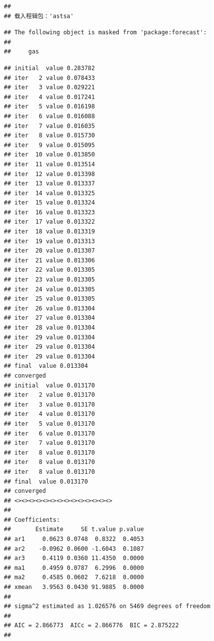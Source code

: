 \documentclass[
]{article}
\newenvironment{Shaded}{\begin{snugshade}}{\end{snugshade}}
\newcommand{\AttributeTok}[1]{\textcolor[rgb]{0.13,0.29,0.53}{#1}}
\newcommand{\DecValTok}[1]{\textcolor[rgb]{0.00,0.00,0.81}{#1}}
\newcommand{\FunctionTok}[1]{\textcolor[rgb]{0.13,0.29,0.53}{\textbf{#1}}}
\newcommand{\NormalTok}[1]{#1}
\newcommand{\OtherTok}[1]{\textcolor[rgb]{0.56,0.35,0.01}{#1}}
\newcommand{\SpecialCharTok}[1]{\textcolor[rgb]{0.81,0.36,0.00}{\textbf{#1}}}
\begin{document}
\begin{verbatim}
## 
## 载入程辑包：'astsa'
\end{verbatim}

\begin{verbatim}
## The following object is masked from 'package:forecast':
## 
##     gas
\end{verbatim}

\begin{Shaded}
\end{Shaded}

\begin{verbatim}
## initial  value 0.283782 
## iter   2 value 0.078433
## iter   3 value 0.029221
## iter   4 value 0.017241
## iter   5 value 0.016198
## iter   6 value 0.016088
## iter   7 value 0.016035
## iter   8 value 0.015730
## iter   9 value 0.015095
## iter  10 value 0.013850
## iter  11 value 0.013514
## iter  12 value 0.013398
## iter  13 value 0.013337
## iter  14 value 0.013325
## iter  15 value 0.013324
## iter  16 value 0.013323
## iter  17 value 0.013322
## iter  18 value 0.013319
## iter  19 value 0.013313
## iter  20 value 0.013307
## iter  21 value 0.013306
## iter  22 value 0.013305
## iter  23 value 0.013305
## iter  24 value 0.013305
## iter  25 value 0.013305
## iter  26 value 0.013304
## iter  27 value 0.013304
## iter  28 value 0.013304
## iter  29 value 0.013304
## iter  29 value 0.013304
## iter  29 value 0.013304
## final  value 0.013304 
## converged
## initial  value 0.013170 
## iter   2 value 0.013170
## iter   3 value 0.013170
## iter   4 value 0.013170
## iter   5 value 0.013170
## iter   6 value 0.013170
## iter   7 value 0.013170
## iter   8 value 0.013170
## iter   8 value 0.013170
## iter   8 value 0.013170
## final  value 0.013170 
## converged
## <><><><><><><><><><><><><><>
##  
## Coefficients: 
##       Estimate     SE t.value p.value
## ar1     0.0623 0.0748  0.8322  0.4053
## ar2    -0.0962 0.0600 -1.6043  0.1087
## ar3     0.4119 0.0360 11.4350  0.0000
## ma1     0.4959 0.0787  6.2996  0.0000
## ma2     0.4585 0.0602  7.6218  0.0000
## xmean   3.9563 0.0430 91.9885  0.0000
## 
## sigma^2 estimated as 1.026576 on 5469 degrees of freedom 
##  
## AIC = 2.866773  AICc = 2.866776  BIC = 2.875222 
## 
\end{verbatim}
\end{document}
